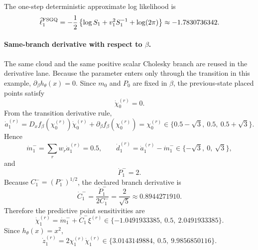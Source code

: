 The one-step deterministic approximate log likelihood is
\begin{equation}
  \widehat\ell_1^{\rm FSGQ}
  =
  -\frac12\left\{\log S_1+v_1^2S_1^{-1}+\log(2\pi)\right\}
  \approx -1.7830736342.
  \label{eq:bf-hd-sgqf-example-ell}
\end{equation}

\paragraph{Same-branch derivative with respect to \texorpdfstring{\(\beta\)}{beta}.}
The same cloud and the same positive scalar Cholesky branch are reused in the
derivative lane.  Because the parameter enters only through the transition in
this example, \(\partial_\beta h_\theta(x)=0\).  Since \(m_0\) and \(P_0\) are
fixed in \(\beta\), the previous-state placed points satisfy
\begin{equation}
  \dot\chi_0^{(r)}=0.
  \label{eq:bf-hd-sgqf-example-prev-dot}
\end{equation}
From the transition derivative rule,
\begin{equation}
  \dot a_1^{(r)}
  =
  D_xf_\beta(\chi_0^{(r)})\dot\chi_0^{(r)}+\partial_\beta f_\beta(\chi_0^{(r)})
  =
  \chi_0^{(r)}
  \in
  \{0.5-\sqrt3,\ 0.5,\ 0.5+\sqrt3\}.
  \label{eq:bf-hd-sgqf-example-adot}
\end{equation}
Hence
\begin{equation}
  \dot m_1^-=
  \sum_rw_r\dot a_1^{(r)}=0.5,
  \qquad
  \dot d_1^{(r)}=\dot a_1^{(r)}-\dot m_1^-
  \in
  \{-\sqrt3,\ 0,\ \sqrt3\},
  \label{eq:bf-hd-sgqf-example-mdot-dotd}
\end{equation}
and
\begin{equation}
  \dot P_1^-=2.
  \label{eq:bf-hd-sgqf-example-Pminus-dot}
\end{equation}
Because \(C_1^-=(P_1^-)^{1/2}\), the declared branch derivative is
\begin{equation}
  \dot C_1^-=
  \frac{\dot P_1^-}{2C_1^-}
  =
  \frac{2}{\sqrt5}
  \approx 0.8944271910.
  \label{eq:bf-hd-sgqf-example-Cdot}
\end{equation}
Therefore the predictive point sensitivities are
\begin{equation}
  \dot\chi_1^{(r)}=\dot m_1^-+\dot C_1^-\xi^{(r)}
  \in
  \{-1.0491933385,\ 0.5,\ 2.0491933385\}.
  \label{eq:bf-hd-sgqf-example-chidot}
\end{equation}
Since \(h_\theta(x)=x^2\),
\begin{equation}
  \dot z_1^{(r)}=2\chi_1^{(r)}\dot\chi_1^{(r)}
  \in
  \{3.0143149884,\ 0.5,\ 9.9856850116\}.
  \label{eq:bf-hd-sgqf-example-zdot}
\end{equation}
